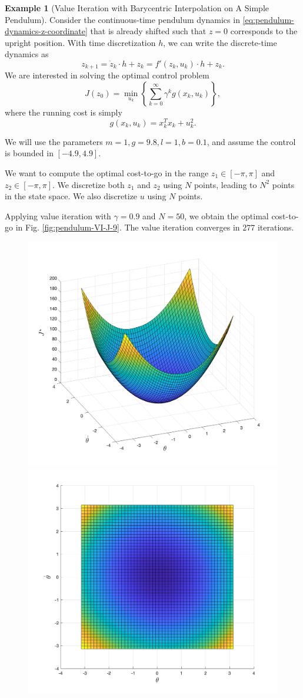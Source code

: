 \documentclass[
]{book}
\theoremstyle{definition}
\theoremstyle{definition}
\newtheorem{example}{Example}[chapter]
\theoremstyle{definition}
\theoremstyle{definition}
\theoremstyle{remark}
\begin{document}
\begin{example}[Value Iteration with Barycentric Interpolation on A Simple Pendulum]
\protect\hypertarget{exm:pendulumvalueiterationbarycentric}{}\label{exm:pendulumvalueiterationbarycentric}Consider the continuous-time pendulum dynamics in \eqref{eq:pendulum-dynamics-z-coordinate} that is already shifted such that \(z=0\) corresponds to the upright position. With time discretization \(h\), we can write the discrete-time dynamics as
\[
z_{k+1} = \dot{z}_k \cdot h + z_k = f'(z_k,u_k) \cdot h + z_k.
\]
We are interested in solving the optimal control problem
\[
J(z_0) = \min_{u_k} \left\{ \sum_{k=0}^{\infty} \gamma^k g(x_k,u_k) \right\},
\]
where the running cost is simply
\[
g(x_k,u_k) = x_k^T x_k + u_k^2.
\]

We will use the parameters \(m=1,g=9.8,l=1,b=0.1\), and assume the control is bounded in \([-4.9,4.9]\).

We want to compute the optimal cost-to-go in the range \(z_1 \in [-\pi,\pi]\) and \(z_2 \in [-\pi,\pi]\). We discretize both \(z_1\) and \(z_2\) using \(N\) points, leading to \(N^2\) points in the state space. We also discretize \(u\) using \(N\) points.

Applying value iteration with \(\gamma=0.9\) and \(N=50\), we obtain the optimal cost-to-go in Fig. \ref{fig:pendulum-VI-J-9}. The value iteration converges in \(277\) iterations.

\begin{figure}

{\centering \includegraphics[width=0.5\linewidth]{images/pendulum-VI-J-0.9-1} \includegraphics[width=0.5\linewidth]{images/pendulum-VI-J-0.9-2} 

}
\end{figure}
\end{example}
\end{document}
